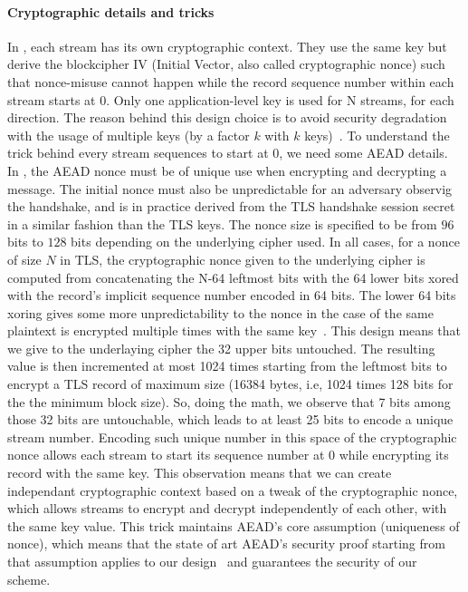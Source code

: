 \paragraph*{Cryptographic details and tricks}
In \tcpls, each stream has its own cryptographic context. They use the same key
but derive the blockcipher IV (Initial Vector, also called cryptographic nonce)
such that nonce-misuse cannot happen while the record sequence number within
each stream starts at 0. Only one application-level key is used for N streams,
for each direction.  The reason behind this design choice is to avoid security
degradation with the usage of multiple keys (by a factor $k$ with $k$
keys)~\cite{chatterjee2011another}. To understand the trick behind every
stream sequences to start at 0, we need some AEAD details. In \tcpls, the AEAD
nonce must be of unique use when encrypting and decrypting a message. The
initial nonce must also be unpredictable for an adversary observig the
handshake, and is in practice derived from the TLS handshake session secret in a
similar fashion than the TLS keys. The nonce size is specified to be from $96$
bits to $128$ bits depending on the underlying cipher used. In all cases, for a
nonce of size $N$ in TLS, the cryptographic nonce given to the underlying cipher
is computed from concatenating the N-64 leftmost bits with the 64 lower bits xored
with the record's implicit sequence number encoded in 64 bits. The lower 64 bits
xoring gives some more unpredictability to the nonce in the case of the same
plaintext is encrypted multiple times with the same key~\cite{bellare2016multi,
  hoang2018multi}. This design means that we give to the underlaying cipher the
32 upper bits untouched. The resulting value is then incremented at most 1024
times starting from the leftmost bits to encrypt a TLS record of maximum size
(16384 bytes, i.e, 1024 times 128 bits for the the minimum block size). So,
doing the math, we observe that 7 bits among those 32 bits are untouchable,
which leads to at least 25 bits to encode a unique stream number. Encoding such
unique number in this space of the cryptographic nonce allows each stream to
start its sequence number at 0 while encrypting its record with the same key.
This observation means that we can create independant cryptographic context
based on a tweak of the cryptographic nonce, which allows streams to encrypt and
decrypt independently of each other, with the same key value. This trick
maintains AEAD's core assumption (uniqueness of nonce), which means that the
state of art AEAD's security proof starting from that assumption applies to our
design~\cite{chatterjee2011another} and guarantees the security of our scheme.

